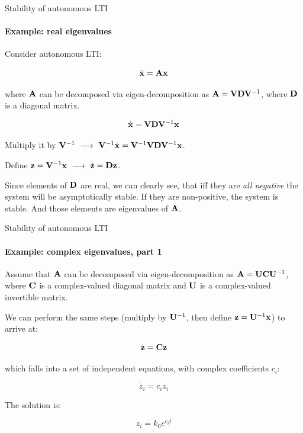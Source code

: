 \documentclass{beamer}
\begin{document}
\begin{frame}{Stability of autonomous LTI}
\framesubtitle{Example: real eigenvalues}
\begin{flushleft}

Consider autonomous LTI:

\begin{equation}
    \dot{\mathbf{x}} = \mathbf{A} \mathbf{x}
\end{equation}

where $\mathbf{A}$ can be decomposed via eigen-decomposition as $\mathbf{A} = \mathbf{V} \mathbf{D} \mathbf{V}^{-1}$, where $\mathbf{D}$ is a diagonal matrix. 

\bigskip

\begin{equation}
    \dot{\mathbf{x}} = \mathbf{V} \mathbf{D} \mathbf{V}^{-1} \mathbf{x}
\end{equation}

Multiply it by $\bo{V}^{-1} 
\ \longrightarrow \ 
\bo{V}^{-1} \dot{\bo{x}} = \bo{V}^{-1} \bo{V} \bo{D} \bo{V}^{-1} \bo{x}$.

Define $\mathbf{z} = \mathbf{V}^{-1} \mathbf{x} 
\ \longrightarrow \
\dot{\mathbf{z}} = \mathbf{D} \mathbf{z}$.

\bigskip

Since elements of $\mathbf{D}$ are real, we can clearly see, that iff they are \emph{all negative} the system will be asymptotically stable. If they are non-positive, the system is stable. And those elements are eigenvalues of $\mathbf{A}$.

\end{flushleft}
\end{frame}



\begin{frame}{Stability of autonomous LTI}
\framesubtitle{Example: complex eigenvalues, part 1}
\begin{flushleft}

Assume that $\mathbf{A}$ can be decomposed via eigen-decomposition as $\mathbf{A} = \mathbf{U} \mathbf{C} \mathbf{U}^{-1}$, where $\mathbf{C}$ is a complex-valued diagonal matrix and $\mathbf{U}$ is a complex-valued invertible matrix. 

\bigskip

We can perform the same steps (multiply by $\mathbf{U}^{-1}$, then define $\mathbf{z} = \mathbf{U}^{-1} \mathbf{x}$) to arrive at:

\begin{equation}
    \dot{\mathbf{z}} = \mathbf{C} \mathbf{z}
\end{equation}

which falls into a set of independent equations, with complex coefficients $c_i$:

\begin{equation}
    \dot{z}_i = c_i z_i
\end{equation}

The solution is:

\begin{equation}
    z_i = k_0 e^{c_i t}
\end{equation}

\end{flushleft}
\end{frame}
\end{document}
